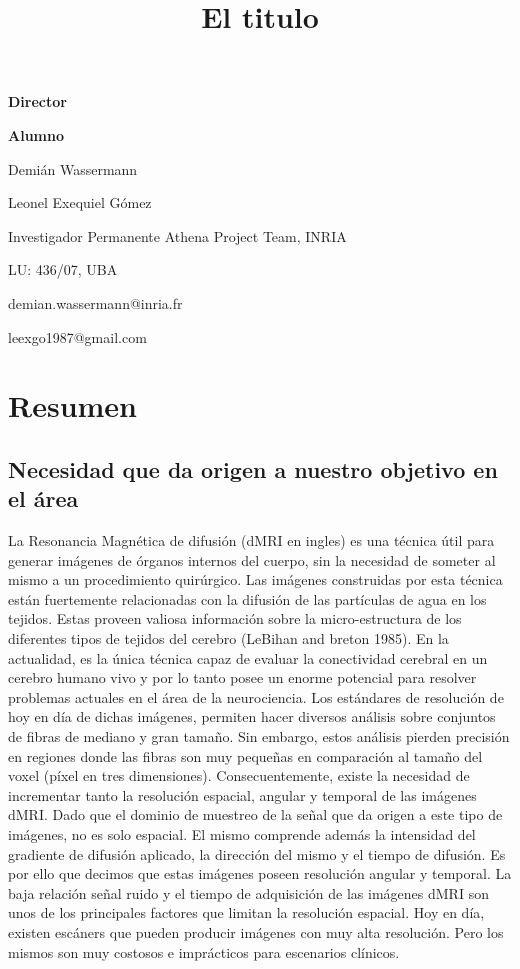 \documentclass[a4paper,10pt]{article}
\title{El titulo}
\newcommand\textline[3][t]{%
  \par\smallskip\noindent\parbox[#1]{.658\textwidth}
  {\raggedright#2}%
  \parbox[#1]{.333\textwidth}{\raggedleft#3}%
}
\begin{document}
{
\textline[t]{\textbf{Director}}{\textbf{Alumno}}
\textline[t]{Demián Wassermann}{Leonel Exequiel G\'omez}
\textline[t]{Investigador Permanente Athena Project Team, INRIA}{LU: 436/07, UBA}
\textline[t]{demian.wassermann@inria.fr}{leexgo1987@gmail.com}
}


\section*{Resumen}

\subsection{Necesidad que da origen a nuestro objetivo en el área}
La Resonancia Magnética de difusión (dMRI en ingles) es una técnica útil para generar imágenes de 
órganos internos del cuerpo, sin la necesidad de someter al mismo a un procedimiento quirúrgico. Las imágenes 
construidas por esta técnica están fuertemente relacionadas con la difusión de las partículas de agua en los tejidos. 
Estas proveen valiosa información sobre la micro-estructura de los diferentes tipos de tejidos del cerebro 
(LeBihan and breton 1985). En la actualidad, es la única técnica capaz de evaluar 
la conectividad cerebral en un cerebro humano vivo y por lo tanto posee un enorme potencial para resolver problemas 
actuales en el área de la neurociencia. Los estándares de resolución de hoy en día de dichas imágenes, permiten hacer 
diversos análisis sobre conjuntos de fibras de mediano y gran tamaño. Sin embargo, estos análisis 
pierden precisión en regiones donde las fibras son muy pequeñas en comparación al tamaño del voxel (píxel en tres 
dimensiones). Consecuentemente, existe la necesidad de incrementar tanto la resolución espacial, angular y temporal de 
las imágenes dMRI. Dado que el dominio de muestreo de la señal que da origen a este tipo de imágenes, no es solo 
espacial. El mismo comprende además la intensidad del gradiente de difusión aplicado, la dirección del mismo y el 
tiempo de difusión. Es por ello que decimos que estas imágenes poseen resolución angular y temporal. La baja 
relaci\'on se\~nal ruido y el tiempo de adquisici\'on de las imágenes dMRI son unos de los principales factores que 
limitan la 
resolución espacial. %
Hoy en día, existen escáners que pueden 
producir imágenes con muy alta resolución. Pero los mismos son muy costosos e 
imprácticos para escenarios clínicos.
\end{document}
